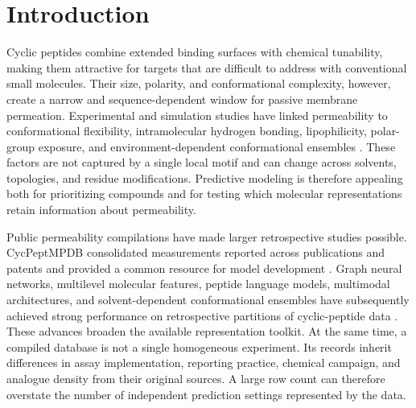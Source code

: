 \documentclass[referee,lineno,pdflatex,Numbered,sn-basic]{sn-jnl}
\begin{document}

\maketitle

\section{Introduction}

Cyclic peptides combine extended binding surfaces with chemical tunability, making them attractive for targets that are difficult to address with conventional small molecules. Their size, polarity, and conformational complexity, however, create a narrow and sequence-dependent window for passive membrane permeation. Experimental and simulation studies have linked permeability to conformational flexibility, intramolecular hydrogen bonding, lipophilicity, polar-group exposure, and environment-dependent conformational ensembles \cite{rezai2006flexibility,wang2021decapeptides,li2022descriptors,linker2022interfaces}. These factors are not captured by a single local motif and can change across solvents, topologies, and residue modifications. Predictive modeling is therefore appealing both for prioritizing compounds and for testing which molecular representations retain information about permeability.

Public permeability compilations have made larger retrospective studies possible. CycPeptMPDB consolidated measurements reported across publications and patents and provided a common resource for model development \cite{li2023cycpeptmpdb}. Graph neural networks, multilevel molecular features, peptide language models, multimodal architectures, and solvent-dependent conformational ensembles have subsequently achieved strong performance on retrospective partitions of cyclic-peptide data \cite{li2024cycpeptmp,feller2025peptideclm,wang2025multicycpermea,wen2026ensemblecycperm}. These advances broaden the available representation toolkit. At the same time, a compiled database is not a single homogeneous experiment. Its records inherit differences in assay implementation, reporting practice, chemical campaign, and analogue density from their original sources. A large row count can therefore overstate the number of independent prediction settings represented by the data.
\end{document}
